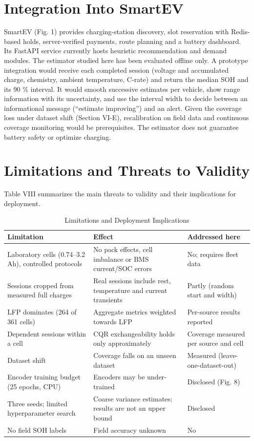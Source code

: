 \documentclass[journal]{IEEEtran}
\begin{document}
\section{Integration Into SmartEV}
SmartEV (Fig. 1) provides charging-station discovery, slot reservation with Redis-based holds, server-verified payments, route planning and a battery dashboard. Its FastAPI service currently hosts heuristic recommendation and demand modules. The estimator studied here has been evaluated offline only. A prototype integration would receive each completed session (voltage and accumulated charge, chemistry, ambient temperature, C-rate) and return the median SOH and its 90 \% interval. It would smooth successive estimates per vehicle, show range information with its uncertainty, and use the interval width to decide between an informational message (``estimate improving'') and an alert. Given the coverage loss under dataset shift (Section VI-E), recalibration on field data and continuous coverage monitoring would be prerequisites. The estimator does not guarantee battery safety or optimize charging.

\section{Limitations and Threats to Validity}
Table VIII summarizes the main threats to validity and their implications for deployment.

\begin{table}[!t]
\centering
\caption{Limitations and Deployment Implications}
\label{tab:8}
\scriptsize
\begin{tabularx}{\columnwidth}{@{}>{\raggedright\arraybackslash}X>{\raggedright\arraybackslash}X>{\raggedright\arraybackslash}X@{}}
\toprule
Limitation & Effect & Addressed here \\
\midrule
Laboratory cells (0.74--3.2 Ah), controlled protocols & No pack effects, cell imbalance or BMS current/SOC errors & No; requires fleet data \\
Sessions cropped from measured full charges & Real sessions include rest, temperature and current transients & Partly (random start and width) \\
LFP dominates (264 of 361 cells) & Aggregate metrics weighted towards LFP & Per-source results reported \\
Dependent sessions within a cell & CQR exchangeability holds only approximately & Coverage measured per source and cell \\
Dataset shift & Coverage falls on an unseen dataset & Measured (leave-one-dataset-out) \\
Encoder training budget (25 epochs, CPU) & Encoders may be under-trained & Disclosed (Fig. 8) \\
Three seeds; limited hyperparameter search & Coarse variance estimates; results are not an upper bound & Disclosed \\
No field SOH labels & Field accuracy unknown & No \\
\bottomrule
\end{tabularx}
\end{table}
\end{document}
